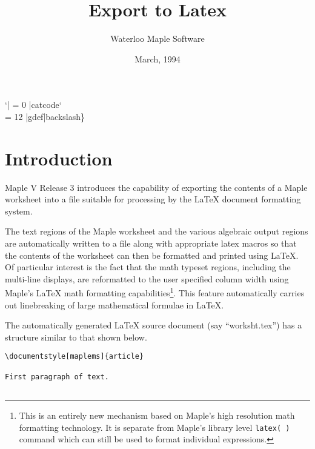 {%
  \catcode`| = 0
  |catcode`\\ = 12
  |gdef|backslash{\}
}

\title{Export to Latex}
\author{Waterloo Maple Software}
\date{March, 1994}

\maketitle

\section{Introduction}
Maple V Release 3 introduces the capability of exporting the 
contents of a Maple worksheet into a file suitable for processing 
by the \LaTeX{} document formatting system.

The text regions of the Maple worksheet and the various algebraic
output regions are automatically written to a file along with 
appropriate latex macros so that the contents of the worksheet 
can then be formatted and printed using \LaTeX{}.
Of particular interest is the fact that the math typeset
regions, including the multi-line displays, are reformatted
to the user specified column width using Maple's \LaTeX{} math formatting
capabilities\footnote{
This is an entirely new mechanism based on Maple's high resolution
math formatting technology. It is separate from Maple's library
level {\tt latex(~)} command which can still be used to format
individual expressions.}.  This feature automatically carries out
linebreaking of large mathematical formulae in \LaTeX{}.

The automatically generated \LaTeX{} source document (say ``worksht.tex'') 
has a structure similar to that shown below.

\begin{verbatim}
\documentstyle[maplems]{article}

First paragraph of text.


\end{verbatim}}
